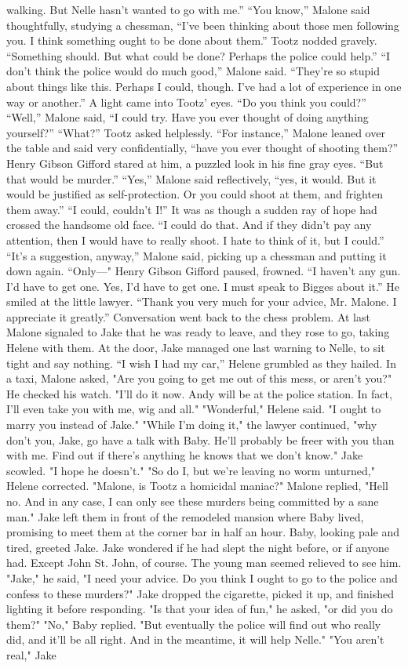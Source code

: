 \documentclass{novel}
\begin{document}
walking. But Nelle hasn’t wanted to go with me.” “You know,” Malone said thoughtfully, studying a chessman, “I’ve been thinking about those men following you. I think something ought to be done about them.” Tootz nodded gravely. “Something should. But what could be done? Perhaps the police could help.” “I don’t think the police would do much good,” Malone said. “They’re so stupid about things like this. Perhaps I could, though. I’ve had a lot of experience in one way or another.” A light came into Tootz’ eyes. “Do you think you could?” “Well,” Malone said, “I could try. Have you ever thought of doing anything yourself?” “What?” Tootz asked helplessly. “For instance,” Malone leaned over the table and said very confidentially, “have you ever thought of shooting them?” Henry Gibson Gifford stared at him, a puzzled look in his fine gray eyes. “But that would be murder.” “Yes,” Malone said reflectively, “yes, it would. But it would be justified as self-protection. Or you could shoot at them, and frighten them away.” “I could, couldn’t I!” It was as though a sudden ray of hope had crossed the handsome old face. “I could do that. And if they didn’t pay any attention, then I would have to really shoot. I hate to think of it, but I could.” “It’s a suggestion, anyway,” Malone said, picking up a chessman and putting it down again. “Only—" Henry Gibson Gifford paused, frowned. “I haven’t any gun. I’d have to get one. Yes, I’d have to get one. I must speak to Bigges about it.” He smiled at the little lawyer. “Thank you very much for your advice, Mr. Malone. I appreciate it greatly.” Conversation went back to the chess problem. At last Malone signaled to Jake that he was ready to leave, and they rose to go, taking Helene with them. At the door, Jake managed one last warning to Nelle, to sit tight and say nothing. “I wish I had my car,” Helene grumbled as they hailed. In a taxi, Malone asked, "Are you going to get me out of this mess, or aren't you?" He checked his watch. "I'll do it now. Andy will be at the police station. In fact, I'll even take you with me, wig and all." "Wonderful," Helene said. "I ought to marry you instead of Jake." "While I'm doing it," the lawyer continued, "why don't you, Jake, go have a talk with Baby. He'll probably be freer with you than with me. Find out if there's anything he knows that we don't know." Jake scowled. "I hope he doesn't." "So do I, but we're leaving no worm unturned," Helene corrected. "Malone, is Tootz a homicidal maniac?" Malone replied, "Hell no. And in any case, I can only see these murders being committed by a sane man." Jake left them in front of the remodeled mansion where Baby lived, promising to meet them at the corner bar in half an hour. Baby, looking pale and tired, greeted Jake. Jake wondered if he had slept the night before, or if anyone had. Except John St. John, of course. The young man seemed relieved to see him. "Jake," he said, "I need your advice. Do you think I ought to go to the police and confess to these murders?" Jake dropped the cigarette, picked it up, and finished lighting it before responding. "Is that your idea of fun," he asked, "or did you do them?" "No," Baby replied. "But eventually the police will find out who really did, and it'll be all right. And in the meantime, it will help Nelle." "You aren't real," Jake 
\end{document}
